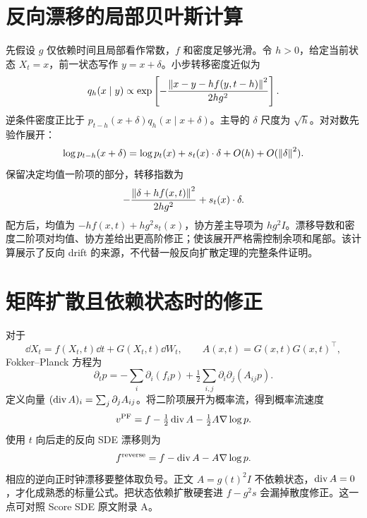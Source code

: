 \section{反向漂移的局部贝叶斯计算}
先假设 $g$ 仅依赖时间且局部看作常数，$f$ 和密度足够光滑。令 $h>0$，给定当前状态 $X_t=x$，前一状态写作 $y=x+\delta$。小步转移密度近似为
\begin{equation}
 q_h(x\mid y)\propto\exp\left[-\frac{\left\lVert x-y-hf(y,t-h)\right\rVert^2}{2hg^2}\right].
\end{equation}
逆条件密度正比于 $p_{t-h}(x+\delta)q_h(x\mid x+\delta)$。主导的 $\delta$ 尺度为 $\sqrt h$。对对数先验作展开：
\begin{equation}
 \log p_{t-h}(x+\delta)
 =\log p_t(x)+s_t(x)\cdot\delta+O(h)+O(\left\lVert\delta\right\rVert^2).
\end{equation}
保留决定均值一阶项的部分，转移指数为
\begin{equation}
 -\frac{\left\lVert\delta+hf(x,t)\right\rVert^2}{2hg^2}
 +s_t(x)\cdot\delta.
\end{equation}
配方后，均值为 $-hf(x,t)+hg^2s_t(x)$，协方差主导项为 $hg^2I$。漂移导数和密度二阶项对均值、协方差给出更高阶修正；使该展开严格需控制余项和尾部。该计算展示了反向 drift 的来源，不代替一般反向扩散定理的完整条件证明。

\section{矩阵扩散且依赖状态时的修正}
对于
\begin{equation}
 \dd X_t=f(X_t,t)\dd t+G(X_t,t)\dd W_t,
 \qquad A(x,t)=G(x,t)G(x,t)^\top,
\end{equation}
Fokker--Planck 方程为
\begin{equation}
 \partial_tp=-\sum_i\partial_i(f_ip)
 +\tfrac12\sum_{i,j}\partial_i\partial_j(A_{ij}p).
\end{equation}
定义向量 $(\operatorname{div} A)_i=\sum_j\partial_jA_{ij}$。将二阶项展开为概率流，得到概率流速度
\begin{equation}
 v^{\mathrm{PF}}=f-\tfrac12\operatorname{div} A-\tfrac12A\nabla\log p.
\end{equation}
使用 $t$ 向后走的反向 SDE 漂移则为
\begin{equation}
 f^{\mathrm{reverse}}=f-\operatorname{div} A-A\nabla\log p.
\end{equation}
相应的逆向正时钟漂移要整体取负号。正文 $A=g(t)^2I$ 不依赖状态，$\operatorname{div} A=0$，才化成熟悉的标量公式。把状态依赖扩散硬套进 $f-g^2s$ 会漏掉散度修正。这一点可对照 Score SDE 原文附录 A\cite{r_sde}。

